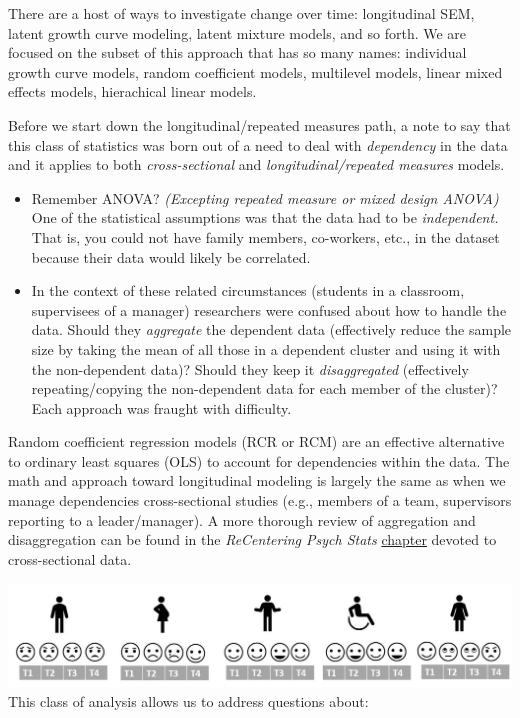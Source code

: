 \documentclass[
  english,
]{book}
\providecommand{\tightlist}{%
  \setlength{\itemsep}{0pt}\setlength{\parskip}{0pt}}
\begin{document}
There are a host of ways to investigate change over time: longitudinal SEM, latent growth curve modeling, latent mixture models, and so forth. We are focused on the subset of this approach that has so many names: individual growth curve models, random coefficient models, multilevel models, linear mixed effects models, hierachical linear models.

Before we start down the longitudinal/repeated measures path, a note to say that this class of statistics was born out of a need to deal with \emph{dependency} in the data and it applies to both \emph{cross-sectional} and \emph{longitudinal/repeated measures} models.

\begin{itemize}
\tightlist
\item
  Remember ANOVA? \emph{(Excepting repeated measure or mixed design ANOVA)} One of the statistical assumptions was that the data had to be \emph{independent.} That is, you could not have family members, co-workers, etc., in the dataset because their data would likely be correlated.
\item
  In the context of these related circumstances (students in a classroom, supervisees of a manager) researchers were confused about how to handle the data. Should they \emph{aggregate} the dependent data (effectively reduce the sample size by taking the mean of all those in a dependent cluster and using it with the non-dependent data)? Should they keep it \emph{disaggregated} (effectively repeating/copying the non-dependent data for each member of the cluster)? Each approach was fraught with difficulty.
\end{itemize}

Random coefficient regression models (RCR or RCM) are an effective alternative to ordinary least squares (OLS) to account for dependencies within the data. The math and approach toward longitudinal modeling is largely the same as when we manage dependencies cross-sectional studies (e.g., members of a team, supervisors reporting to a leader/manager). A more thorough review of aggregation and disaggregation can be found in the \emph{ReCentering Psych Stats} \protect\hyperlink{wGroups}{chapter} devoted to cross-sectional data.

\includegraphics{images/LongExpl/LongNesting.jpg}
This class of analysis allows us to address questions about:
\end{document}
